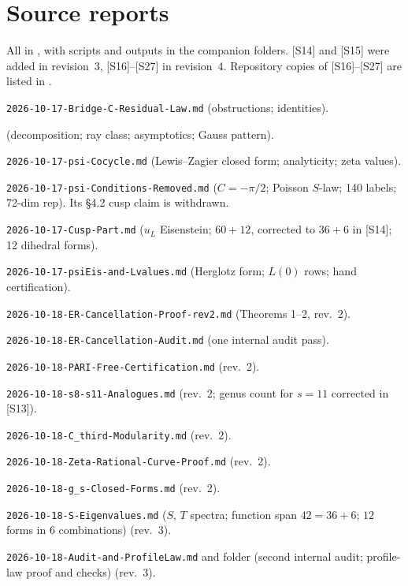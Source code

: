\documentclass[11pt]{article}
\theoremstyle{definition}
\begin{document}
\section*{Source reports}\label{sec:sources}
All in , with scripts and outputs in the companion folders. [S14] and [S15] were added in revision~3,
[S16]--[S27] in revision~4. Repository copies of [S16]--[S27] are listed in .
\begin{enumerate}[label={[S\arabic*]},leftmargin=3em]
\item \texttt{2026-10-17-Bridge-C-Residual-Law.md} (obstructions; identities).
\item {} (decomposition; ray class; asymptotics; Gauss pattern).
\item \texttt{2026-10-17-psi-Cocycle.md} (Lewis--Zagier closed form; analyticity; zeta values).
\item \texttt{2026-10-17-psi-Conditions-Removed.md} ($C=-\pi/2$; Poisson $S$-law; 140 labels; 72-dim rep). Its \S4.2 cusp claim is withdrawn.
\item \texttt{2026-10-17-Cusp-Part.md} ($u_L$ Eisenstein; $60+12$, corrected to $36+6$ in [S14]; 12 dihedral forms).
\item \texttt{2026-10-17-psiEis-and-Lvalues.md} (Herglotz form; $L(0)$ rows; hand certification).
\item \texttt{2026-10-18-ER-Cancellation-Proof-rev2.md} (Theorems 1--2, rev.~2).
\item \texttt{2026-10-18-ER-Cancellation-Audit.md} (one internal audit pass).
\item \texttt{2026-10-18-PARI-Free-Certification.md} (rev.~2).
\item \texttt{2026-10-18-s8-s11-Analogues.md} (rev.~2; genus count for $s=11$ corrected in [S13]).
\item \texttt{2026-10-18-C\_third-Modularity.md} (rev.~2).
\item \texttt{2026-10-18-Zeta-Rational-Curve-Proof.md} (rev.~2).
\item \texttt{2026-10-18-g\_s-Closed-Forms.md} (rev.~2).
\item \texttt{2026-10-18-S-Eigenvalues.md} ($S$, $T$ spectra; function span $42=36+6$; $12$ forms in $6$ combinations) (rev.~3).
\item \texttt{2026-10-18-Audit-and-ProfileLaw.md} and folder  (second internal audit; profile-law proof and checks) (rev.~3).

\end{enumerate}
\end{document}
